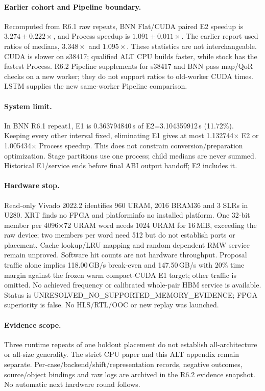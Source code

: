 \documentclass[10pt]{article}
\begin{document}
\paragraph{Earlier cohort and Pipeline boundary.} Recomputed from R6.1 raw repeats, BNN Flat/CUDA paired E2 speedup is $3.274\pm0.222\times$, and Process speedup is $1.091\pm0.011\times$. The earlier report used ratios of medians, $3.348\times$ and $1.095\times$. These statistics are not interchangeable. CUDA is slower on s38417; qualified ALT CPU builds faster, while stock has the fastest Process. R6.2 Pipeline supplements for s38417 and BNN pass map/QoR checks on a new worker; they do not support ratios to old-worker CUDA times. LSTM supplies the new same-worker Pipeline comparison.

\paragraph{System limit.} In BNN R6.1 repeat1, E1 is 0.363794840\,s of E2=3.104359912\,s (11.72\%). Keeping every other interval fixed, eliminating E1 gives at most 1.132744$\times$ E2 or 1.005434$\times$ Process speedup. This does not constrain conversion/preparation optimization. Stage partitions use one process; child medians are never summed. Historical E1/service ends before final ABI output handoff; E2 includes it.

\paragraph{Hardware stop.} Read-only Vivado 2022.2 identifies 960 URAM, 2016 BRAM36 and 3 SLRs in U280. XRT finds no FPGA and platforminfo no installed platform. One 32-bit member per 4096$\times$72 URAM word needs 1024 URAM for 16\,MiB, exceeding the raw device; two members per word need 512 but do not establish ports or placement. Cache lookup/LRU mapping and random dependent RMW service remain unproved. Software hit counts are not hardware throughput. Proposal traffic alone implies 118.00\,GB/s break-even and 147.50\,GB/s with 20\% time margin against the frozen warm compact-CUDA E1 target; other traffic is omitted. No achieved frequency or calibrated whole-pair HBM service is available. Status is UNRESOLVED\_NO\_SUPPORTED\_MEMORY\_EVIDENCE; FPGA superiority is false. No HLS/RTL/OOC or new replay was launched.

\paragraph{Evidence scope.} Three runtime repeats of one holdout placement do not establish all-architecture or all-size generality. The strict CPU paper and this ALT appendix remain separate. Per-case/backend/shift/representation records, negative outcomes, source/object bindings and raw logs are archived in the R6.2 evidence snapshot. No automatic next hardware round follows.
\end{document}
